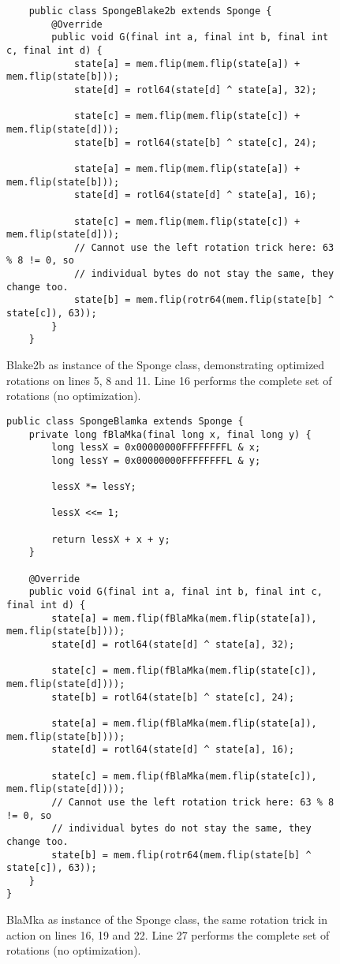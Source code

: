 \begin{figure}
\small
\begin{verbatim}
    public class SpongeBlake2b extends Sponge {
        @Override
        public void G(final int a, final int b, final int c, final int d) {
            state[a] = mem.flip(mem.flip(state[a]) + mem.flip(state[b]));
            state[d] = rotl64(state[d] ^ state[a], 32);

            state[c] = mem.flip(mem.flip(state[c]) + mem.flip(state[d]));
            state[b] = rotl64(state[b] ^ state[c], 24);

            state[a] = mem.flip(mem.flip(state[a]) + mem.flip(state[b]));
            state[d] = rotl64(state[d] ^ state[a], 16);

            state[c] = mem.flip(mem.flip(state[c]) + mem.flip(state[d]));
            // Cannot use the left rotation trick here: 63 % 8 != 0, so
            // individual bytes do not stay the same, they change too.
            state[b] = mem.flip(rotr64(mem.flip(state[b] ^ state[c]), 63));
        }
    }
\end{verbatim}
\normalsize
\caption{Blake2b as instance of the Sponge class, demonstrating optimized rotations on lines 5, 8 and 11. Line 16 performs the complete set of rotations (no optimization).}
\label{fig:sponge-blake2b}
\end{figure}


\begin{figure}
\small
\begin{verbatim}
public class SpongeBlamka extends Sponge {
    private long fBlaMka(final long x, final long y) {
        long lessX = 0x00000000FFFFFFFFL & x;
        long lessY = 0x00000000FFFFFFFFL & y;

        lessX *= lessY;

        lessX <<= 1;

        return lessX + x + y;
    }

    @Override
    public void G(final int a, final int b, final int c, final int d) {
        state[a] = mem.flip(fBlaMka(mem.flip(state[a]), mem.flip(state[b])));
        state[d] = rotl64(state[d] ^ state[a], 32);

        state[c] = mem.flip(fBlaMka(mem.flip(state[c]), mem.flip(state[d])));
        state[b] = rotl64(state[b] ^ state[c], 24);

        state[a] = mem.flip(fBlaMka(mem.flip(state[a]), mem.flip(state[b])));
        state[d] = rotl64(state[d] ^ state[a], 16);

        state[c] = mem.flip(fBlaMka(mem.flip(state[c]), mem.flip(state[d])));
        // Cannot use the left rotation trick here: 63 % 8 != 0, so
        // individual bytes do not stay the same, they change too.
        state[b] = mem.flip(rotr64(mem.flip(state[b] ^ state[c]), 63));
    }
}
\end{verbatim}
\normalsize
\caption{BlaMka as instance of the Sponge class, the same rotation trick in action on lines 16, 19 and 22. Line 27 performs the complete set of rotations (no optimization).}
\label{fig:sponge-blamka}
\end{figure}
